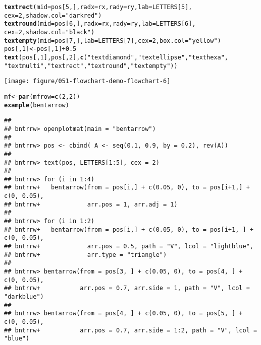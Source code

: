 \documentclass{article}\usepackage[]{graphicx}\usepackage[]{color}
\makeatletter
\def\maxwidth{ %
  \ifdim\Gin@nat@width>\linewidth
    \linewidth
  \else
    \Gin@nat@width
  \fi
}
\newcommand{\hlnum}[1]{\textcolor[rgb]{0.686,0.059,0.569}{#1}}%
\newcommand{\hlstr}[1]{\textcolor[rgb]{0.192,0.494,0.8}{#1}}%
\newcommand{\hlopt}[1]{\textcolor[rgb]{0,0,0}{#1}}%
\newcommand{\hlstd}[1]{\textcolor[rgb]{0.345,0.345,0.345}{#1}}%
\newcommand{\hlkwb}[1]{\textcolor[rgb]{0.69,0.353,0.396}{#1}}%
\newcommand{\hlkwc}[1]{\textcolor[rgb]{0.333,0.667,0.333}{#1}}%
\newcommand{\hlkwd}[1]{\textcolor[rgb]{0.737,0.353,0.396}{\textbf{#1}}}%
\newenvironment{kframe}{%
 \def\at@end@of@kframe{}%
 \ifinner\ifhmode%
  \def\at@end@of@kframe{\end{minipage}}%
  \begin{minipage}{\columnwidth}%
 \fi\fi%
 \def\FrameCommand##1{\hskip\@totalleftmargin \hskip-\fboxsep
 \colorbox{shadecolor}{##1}\hskip-\fboxsep
     \hskip-\linewidth \hskip-\@totalleftmargin \hskip\columnwidth}%
 \MakeFramed {\advance\hsize-\width
   \@totalleftmargin\z@ \linewidth\hsize
   \@setminipage}}%
 {\par\unskip\endMakeFramed%
 \at@end@of@kframe}
\newenvironment{knitrout}{}{} %
\makeatother
\begin{document}
\begin{knitrout}
\begin{kframe}
\begin{alltt}
\hlkwd{textrect}\hlstd{(}\hlkwc{mid} \hlstd{= pos[}\hlnum{5}\hlstd{, ],} \hlkwc{radx} \hlstd{= rx,} \hlkwc{rady} \hlstd{= ry,} \hlkwc{lab} \hlstd{= LETTERS[}\hlnum{5}\hlstd{],}
    \hlkwc{cex} \hlstd{=} \hlnum{2}\hlstd{,} \hlkwc{shadow.col} \hlstd{=} \hlstr{"darkred"}\hlstd{)}
\hlkwd{textround}\hlstd{(}\hlkwc{mid} \hlstd{= pos[}\hlnum{6}\hlstd{, ],} \hlkwc{radx} \hlstd{= rx,} \hlkwc{rady} \hlstd{= ry,} \hlkwc{lab} \hlstd{= LETTERS[}\hlnum{6}\hlstd{],}
    \hlkwc{cex} \hlstd{=} \hlnum{2}\hlstd{,} \hlkwc{shadow.col} \hlstd{=} \hlstr{"black"}\hlstd{)}
\hlkwd{textempty}\hlstd{(}\hlkwc{mid} \hlstd{= pos[}\hlnum{7}\hlstd{, ],} \hlkwc{lab} \hlstd{= LETTERS[}\hlnum{7}\hlstd{],} \hlkwc{cex} \hlstd{=} \hlnum{2}\hlstd{,} \hlkwc{box.col} \hlstd{=} \hlstr{"yellow"}\hlstd{)}
\hlstd{pos[,} \hlnum{1}\hlstd{]} \hlkwb{<-} \hlstd{pos[,} \hlnum{1}\hlstd{]} \hlopt{+} \hlnum{0.5}
\hlkwd{text}\hlstd{(pos[,} \hlnum{1}\hlstd{], pos[,} \hlnum{2}\hlstd{],} \hlkwd{c}\hlstd{(}\hlstr{"textdiamond"}\hlstd{,} \hlstr{"textellipse"}\hlstd{,} \hlstr{"texthexa"}\hlstd{,}
    \hlstr{"textmulti"}\hlstd{,} \hlstr{"textrect"}\hlstd{,} \hlstr{"textround"}\hlstd{,} \hlstr{"textempty"}\hlstd{))}
\end{alltt}
\end{kframe}
\texttt{[image: figure/051-flowchart-demo-flowchart-6]} 
\begin{kframe}\begin{alltt}
\hlstd{mf} \hlkwb{<-} \hlkwd{par}\hlstd{(}\hlkwc{mfrow} \hlstd{=} \hlkwd{c}\hlstd{(}\hlnum{2}\hlstd{,} \hlnum{2}\hlstd{))}
\hlkwd{example}\hlstd{(bentarrow)}
\end{alltt}
\begin{verbatim}
## 
## bntrrw> openplotmat(main = "bentarrow")
## 
## bntrrw> pos <- cbind( A <- seq(0.1, 0.9, by = 0.2), rev(A))
## 
## bntrrw> text(pos, LETTERS[1:5], cex = 2)
## 
## bntrrw> for (i in 1:4) 
## bntrrw+   bentarrow(from = pos[i,] + c(0.05, 0), to = pos[i+1,] + c(0, 0.05),
## bntrrw+             arr.pos = 1, arr.adj = 1)
## 
## bntrrw> for (i in 1:2) 
## bntrrw+   bentarrow(from = pos[i,] + c(0.05, 0), to = pos[i+1, ] + c(0, 0.05),
## bntrrw+             arr.pos = 0.5, path = "V", lcol = "lightblue", 
## bntrrw+             arr.type = "triangle")
## 
## bntrrw> bentarrow(from = pos[3, ] + c(0.05, 0), to = pos[4, ] + c(0, 0.05),
## bntrrw+           arr.pos = 0.7, arr.side = 1, path = "V", lcol = "darkblue")
## 
## bntrrw> bentarrow(from = pos[4, ] + c(0.05, 0), to = pos[5, ] + c(0, 0.05),
## bntrrw+           arr.pos = 0.7, arr.side = 1:2, path = "V", lcol = "blue")

\end{verbatim}
\end{kframe}
\end{knitrout}
\end{document}

